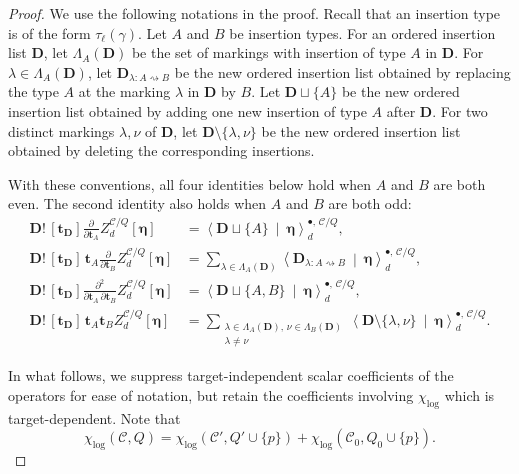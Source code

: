 \documentclass[letterpaper,12pt]{amsart}
\theoremstyle{definition}
\newcommand{\cC}{\mathcal C}
\numberwithin{equation}{section}
\begin{document}
\begin{proof}

We use the following notations in the proof. Recall that an insertion type is of the form \(\tau_\ell(\gamma)\).
Let \(A\) and \(B\) be insertion types.
For an ordered insertion list \(\mathbf D\), let
\(\Lambda_A(\mathbf D)\) be the set of markings with insertion of type
\(A\) in \(\mathbf D\).  For
\(\lambda\in\Lambda_A(\mathbf D)\), let
\(\mathbf D_{\lambda:A\rightsquigarrow B}\) be the new ordered insertion list obtained by replacing the type \(A\) at the
marking \(\lambda\) in $\mathbf D$ by \(B\).  Let
\(\mathbf D\sqcup\{A\}\) be the  new ordered insertion list obtained by adding one new insertion of type \(A\) after $\mathbf D$.
For two distinct markings \(\lambda,\nu\) of \(\mathbf D\), let
\(\mathbf D\setminus\{\lambda,\nu\}\) be the new  ordered insertion list obtained by deleting the corresponding insertions. 

With these conventions, all four identities below hold when \(A\) and \(B\) are
both even.  The second identity also holds when \(A\) and \(B\) are
both odd:
\begin{align*}
\mathbf D!\,[\mathbf t_{\mathbf D}]\frac{\partial}{\partial\mathbf t_A} Z_d^{\cC/Q}[\boldsymbol\eta]&=\left\langle\mathbf D\sqcup\{A\}\ \middle|\ \boldsymbol\eta\right\rangle_d^{\bullet,\,\cC/Q},\\
\mathbf D!\,[\mathbf t_{\mathbf D}]\,\mathbf t_A\frac{\partial}{\partial\mathbf t_B} Z_d^{\cC/Q}[\boldsymbol\eta]&=\sum_{\lambda\in\Lambda_A(\mathbf D)}\left\langle\mathbf D_{\lambda:A\rightsquigarrow B}\ \middle|\ \boldsymbol\eta\right\rangle_d^{\bullet,\,\cC/Q},\\
\mathbf D!\,[\mathbf t_{\mathbf D}]\frac{\partial^2 }{\partial\mathbf t_A\,\partial\mathbf t_B}Z_d^{\cC/Q}[\boldsymbol\eta]&=\left\langle\mathbf D\sqcup\{A,B\}\ \middle|\ \boldsymbol\eta\right\rangle_d^{\bullet,\,\cC/Q},\\
\mathbf D!\,[\mathbf t_{\mathbf D}]\,\mathbf t_A\mathbf t_B Z_d^{\cC/Q}[\boldsymbol\eta]&=\sum_{\substack{\lambda\in\Lambda_A(\mathbf D),\,\nu\in\Lambda_B(\mathbf D)\\ \lambda\ne\nu}}\left\langle\mathbf D\setminus\{\lambda,\nu\}\ \middle|\ \boldsymbol\eta\right\rangle_d^{\bullet,\,\cC/Q}.
\end{align*}

In what follows, we suppress target-independent scalar coefficients of the operators for ease of notation, but retain
the coefficients involving \(\chi_{\log}\) which is target-dependent. Note that
\begin{equation}\label{eq:chi-log-degeneration-in-proof}
\chi_{\log}(\cC,Q)=\chi_{\log}(\cC',Q'\cup\{p\})+\chi_{\log}(\cC_0,Q_0\cup\{p\}).
\end{equation}


\end{proof}
\end{document}
